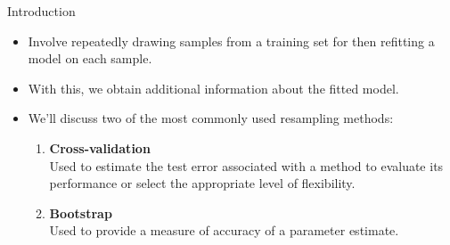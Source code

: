 \begin{frame}{Introduction}

\begin{itemize}
    \item Involve repeatedly drawing samples from a training set for then refitting a model on each sample. \pause 
    
    \item With this, we obtain additional information about the fitted model. \pause

    \item We'll discuss two of the most commonly used resampling methods: \pause

    \begin{enumerate}
        \item \textbf{Cross-validation} \pause \\ 
       Used to estimate the test error associated with a method to evaluate its performance or select the appropriate level of flexibility.  \pause 
        
        \item \textbf{Bootstrap} \pause \\  
        Used to provide a measure of accuracy of a parameter estimate.
    \end{enumerate}
     
    
\end{itemize}
    
\end{frame}